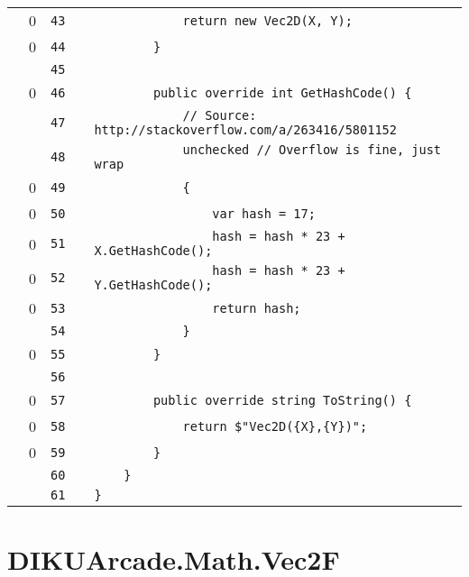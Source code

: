 \documentclass[a4paper,landscape,10pt]{article}
\begin{document}
\begin{longtable}[l]{lrrll}
\cellcolor{red} & 0 & \verb~43~ & & \verb~            return new Vec2D(X, Y);~\\
\cellcolor{red} & 0 & \verb~44~ & & \verb~        }~\\
\cellcolor{gray} &  & \verb~45~ & & \verb~~\\
\cellcolor{red} & 0 & \verb~46~ & & \verb~        public override int GetHashCode() {~\\
\cellcolor{gray} &  & \verb~47~ & & \verb~            // Source: http://stackoverflow.com/a/263416/5801152~\\
\cellcolor{gray} &  & \verb~48~ & & \verb~            unchecked // Overflow is fine, just wrap~\\
\cellcolor{red} & 0 & \verb~49~ & & \verb~            {~\\
\cellcolor{red} & 0 & \verb~50~ & & \verb~                var hash = 17;~\\
\cellcolor{red} & 0 & \verb~51~ & & \verb~                hash = hash * 23 + X.GetHashCode();~\\
\cellcolor{red} & 0 & \verb~52~ & & \verb~                hash = hash * 23 + Y.GetHashCode();~\\
\cellcolor{red} & 0 & \verb~53~ & & \verb~                return hash;~\\
\cellcolor{gray} &  & \verb~54~ & & \verb~            }~\\
\cellcolor{red} & 0 & \verb~55~ & & \verb~        }~\\
\cellcolor{gray} &  & \verb~56~ & & \verb~~\\
\cellcolor{red} & 0 & \verb~57~ & & \verb~        public override string ToString() {~\\
\cellcolor{red} & 0 & \verb~58~ & & \verb~            return $"Vec2D({X},{Y})";~\\
\cellcolor{red} & 0 & \verb~59~ & & \verb~        }~\\
\cellcolor{gray} &  & \verb~60~ & & \verb~    }~\\
\cellcolor{gray} &  & \verb~61~ & & \verb~}~\\
\end{longtable}
\newpage
\section{DIKUArcade.Math.Vec2F}
\end{document}
